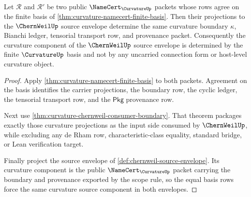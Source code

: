 \begin{theorem}
\label{thm:curvature-chernweil-export-determinacy}
Let $\mathcal{R}$ and $\mathcal{R}'$ be two public $\NameCert_{\CurvatureUp}$ packets whose rows agree on the finite basis of \autoref{thm:curvature-namecert-finite-basis}. Then their projections to the $\ChernWeilUp$ source envelope determine the same curvature boundary $\kappa$, Bianchi ledger, tensorial transport row, and provenance packet. Consequently the curvature component of the $\ChernWeilUp$ source envelope is determined by the finite $\CurvatureUp$ basis and not by any uncarried connection form or host-level curvature object.
\end{theorem}
\begin{proof}
Apply \autoref{thm:curvature-namecert-finite-basis} to both packets. Agreement on the basis identifies the carrier projections, the boundary row, the cyclic ledger, the tensorial transport row, and the $\mathsf{Pkg}$ provenance row.

Next use \autoref{thm:curvature-chernweil-consumer-boundary}. That theorem packages exactly those curvature projections as the input side consumed by $\ChernWeilUp$, while excluding any de Rham row, characteristic-class equality, standard bridge, or Lean verification target.

Finally project the source envelope of \autoref{def:chernweil-source-envelope}. Its curvature component is the public $\NameCert_{\CurvatureUp}$ packet carrying the boundary and provenance exported by the scope rule, so the equal basis rows force the same curvature source component in both envelopes.
\end{proof}

